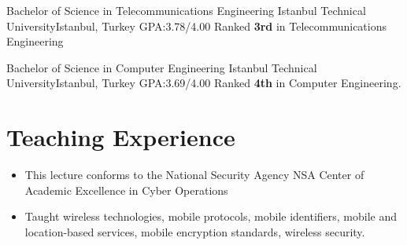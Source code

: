 \documentclass[10pt,letterpaper,roman]{moderncv}
\begin{document}
{Bachelor of Science in Telecommunications Engineering} 
{Istanbul Technical University}{Istanbul, Turkey} 
{GPA:3.78/4.00} 
{Ranked \textbf{3rd} in Telecommunications Engineering} 
\vspace*{1mm} 

{Bachelor of Science in Computer Engineering} 
{Istanbul Technical University}{Istanbul, Turkey} 
{GPA:3.69/4.00} 
{Ranked \textbf{4th}  in Computer Engineering.} 
\vspace*{1mm} 


\section{Teaching Experience} 
\vspace*{1mm} 

 { 
\begin{itemize}%
	\item This lecture conforms to the National Security Agency NSA Center of Academic Excellence in Cyber Operations 
	\item Taught wireless technologies, mobile protocols, mobile identifiers, mobile and location-based services, mobile encryption standards, wireless security.
\end{itemize}} 
\vspace*{1mm} 
	
 { 
}
 { 
}
 { 
}

\end{document}
